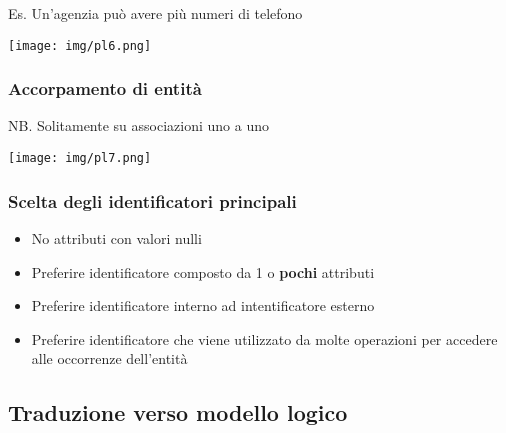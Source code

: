 \documentclass[a4paper]{article}
\begin{document}
Es. Un'agenzia può avere più numeri di telefono
\begin{center}
      \texttt{[image: img/pl6.png]}
\end{center}\par \subsubsection{Accorpamento di entità}
NB. Solitamente su associazioni uno a uno
\begin{center}
      \texttt{[image: img/pl7.png]}
\end{center}\par \subsubsection{Scelta degli identificatori principali}
\begin{itemize}[noitemsep]
  \item No attributi con valori nulli
  \item Preferire identificatore composto da 1 o \textbf{pochi} attributi
  \item Preferire identificatore interno ad intentificatore esterno
  \item Preferire identificatore che viene utilizzato da molte operazioni per accedere alle occorrenze dell'entità
\end{itemize}\par \subsection{Traduzione verso modello logico}
\end{document}
